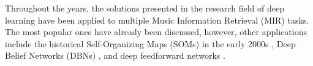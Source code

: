 Throughout the years, the solutions presented in the
research field of deep learning have been applied to
multiple Music Information Retrieval (MIR) tasks. The most
popular ones have already been discussed, however, other
applications include the historical Self-Organizing Maps
(SOMs) in the early 2000s \parencite{kiernan2000scorebased,
harford2003automatic}, Deep Belief Networks (DBNs)
\parencite{hamel2010learning, schmidt2013learning,
chacon2014developing, raczynski2010multiple,
battenberg2012analyzing, herwaarden2014predicting,
zhou2015chord}, and deep feedforward networks
\parencite{cherla2014multiple,  liang2015contentaware,
dawson2018keyfinding, valk2018deep}.
